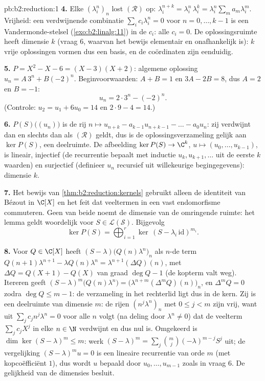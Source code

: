 \begin{solution}{pb:b2:reduction:1}
\textbf{4.} Elke $(\lambda_i^n)_n$ lost $(\mathcal R)$ op:
$\lambda_i^{n+k} = \lambda_i^n\,\lambda_i^k = \lambda_i^n\sum_m
a_m\lambda_i^m$. Vrijheid: een verdwijnende combinatie $\sum_i
c_i\lambda_i^n = 0$ voor $n = 0, \dots, k-1$ is een
Vandermonde-stelsel (\cref{exo:b2:linalg:11}) in de $c_i$: alle
$c_i = 0$. De oplossingsruimte heeft dimensie $k$ (vraag 6, waarvan
het bewijs elementair en onafhankelijk is): $k$ vrije oplossingen
vormen dus een basis, en de coördinaten zijn eenduidig.

\textbf{5.} $P = X^2 - X - 6 = (X - 3)(X + 2)$: algemene oplossing
$u_n = A\,3^n + B(-2)^n$. Beginvoorwaarden: $A + B = 1$ en $3A - 2B
= 8$, dus $A = 2$ en $B = -1$:
\[
u_n = 2\cdot 3^n - (-2)^n .
\]
(Controle: $u_2 = u_1 + 6u_0 = 14$ en $2\cdot9 - 4 = 14$.)

\textbf{6.} $P(S)\bigl((u_n)\bigr)$ is de rij $n \mapsto u_{n+k} -
a_{k-1}u_{n+k-1} - \dots - a_0u_n$: zij verdwijnt dan en slechts
dan als $(\mathcal R)$ geldt, dus is de oplossingsverzameling gelijk
aan $\ker P(S)$, een deelruimte. De afbeelding $\ker P(S) \to
\C^k$, $u \mapsto (u_0, \dots, u_{k-1})$, is lineair, injectief (de
recurrentie bepaalt met inductie $u_{k}, u_{k+1}, \dots$ uit de
eerste $k$ waarden) en surjectief (definieer $u_n$ recursief uit
willekeurige begingegevens): dimensie $k$.

\textbf{7.} Het bewijs van \cref{thm:b2:reduction:kernels} gebruikt
alleen de identiteit van Bézout in $\C[X]$ en het feit dat
veeltermen in een vast endomorfisme commuteren. Geen van beide
noemt de dimensie van de omringende ruimte: het lemma geldt
woordelijk voor $S \in \mathcal{L}(\mathcal{S})$. Bijgevolg
\[
\ker P(S) = \bigoplus_{i=1}^{r}
\ker\,(S - \lambda_i\,\mathrm{id})^{m_i}.
\]

\textbf{8.} Voor $Q \in \C[X]$ heeft $(S -
\lambda)\bigl(Q(n)\lambda^n\bigr)_n$ als $n$-de term
$Q(n{+}1)\lambda^{n+1} - \lambda Q(n)\lambda^n =
\lambda^{n+1}(\Delta Q)(n)$, met $\Delta Q = Q(X{+}1) - Q(X)$ van
graad $\deg Q - 1$ (de kopterm valt weg). Itereren geeft $(S -
\lambda)^m\bigl(Q(n)\lambda^n\bigr) = \bigl(\lambda^{n+m}(\Delta^m
Q)(n)\bigr)_n$, en $\Delta^m Q = 0$ zodra $\deg Q \leq m - 1$: de
verzameling in het rechterlid ligt dus in de kern. Zij is een
deelruimte van dimensie $m$: de rijen $(n^j\lambda^n)_n$ met $0
\leq j < m$ zijn vrij, want uit $\sum_j c_j n^j\lambda^n = 0$ voor
alle $n$ volgt (na deling door $\lambda^n \neq 0$) dat de veelterm
$\sum_j c_jX^j$ in elke $n \in \N$ verdwijnt en dus nul is.
Omgekeerd is $\dim\ker(S - \lambda)^m \leq m$: werk $(S -
\lambda)^m = \sum_j \binom mj(-\lambda)^{m-j}S^j$ uit; de
vergelijking $(S - \lambda)^m u = 0$ is een lineaire recurrentie
van orde $m$ (met kopcoëfficiënt $1$), dus wordt $u$ bepaald door
$u_0, \dots, u_{m-1}$ zoals in vraag 6. De gelijkheid van de
dimensies besluit.


\end{solution}
